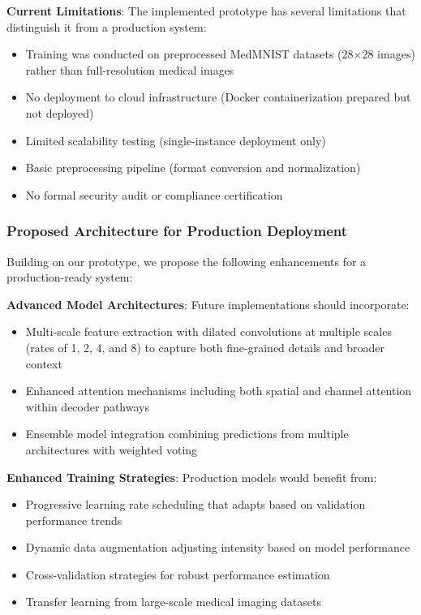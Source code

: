 \documentclass[12pt,a4paper]{article}
\begin{document}
\textbf{Current Limitations}: The implemented prototype has several limitations that distinguish it from a production system:
\begin{itemize}
    \item Training was conducted on preprocessed MedMNIST datasets (28×28 images) rather than full-resolution medical images
    \item No deployment to cloud infrastructure (Docker containerization prepared but not deployed)
    \item Limited scalability testing (single-instance deployment only)
    \item Basic preprocessing pipeline (format conversion and normalization)
    \item No formal security audit or compliance certification
\end{itemize}

\subsubsection{Proposed Architecture for Production Deployment}

Building on our prototype, we propose the following enhancements for a production-ready system:

\textbf{Advanced Model Architectures}: Future implementations should incorporate:
\begin{itemize}
    \item Multi-scale feature extraction with dilated convolutions at multiple scales (rates of 1, 2, 4, and 8) to capture both fine-grained details and broader context
    \item Enhanced attention mechanisms including both spatial and channel attention within decoder pathways
    \item Ensemble model integration combining predictions from multiple architectures with weighted voting
\end{itemize}

\textbf{Enhanced Training Strategies}: Production models would benefit from:
\begin{itemize}
    \item Progressive learning rate scheduling that adapts based on validation performance trends
    \item Dynamic data augmentation adjusting intensity based on model performance
    \item Cross-validation strategies for robust performance estimation
    \item Transfer learning from large-scale medical imaging datasets
\end{itemize}
\end{document}
